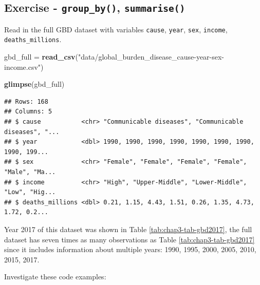 \documentclass[
  12pt,
  krantz2]{krantz}
\makeatletter
\newenvironment{Shaded}{\begin{snugshade}}{\end{snugshade}}
\newcommand{\DataTypeTok}[1]{\textcolor[rgb]{0.13,0.29,0.53}{#1}}
\newcommand{\KeywordTok}[1]{\textcolor[rgb]{0.13,0.29,0.53}{\textbf{#1}}}
\newcommand{\NormalTok}[1]{#1}
\newcommand{\OperatorTok}[1]{\textcolor[rgb]{0.81,0.36,0.00}{\textbf{#1}}}
\newcommand{\StringTok}[1]{\textcolor[rgb]{0.31,0.60,0.02}{#1}}
\newenvironment{kframe}{%
\medskip{}
\setlength{\fboxsep}{.8em}
 \def\at@end@of@kframe{}%
 \ifinner\ifhmode%
  \def\at@end@of@kframe{\end{minipage}}%
  \begin{minipage}{\columnwidth}%
 \fi\fi%
 \def\FrameCommand##1{\hskip\@totalleftmargin \hskip-\fboxsep
 \colorbox{shadecolor}{##1}\hskip-\fboxsep
     \hskip-\linewidth \hskip-\@totalleftmargin \hskip\columnwidth}%
 \MakeFramed {\advance\hsize-\width
   \@totalleftmargin\z@ \linewidth\hsize
   \@setminipage}}%
 {\par\unskip\endMakeFramed%
 \at@end@of@kframe}
\renewenvironment{Shaded}{\begin{kframe}}{\end{kframe}}
\makeatother
\begin{document}
\begin{Shaded}
\end{Shaded}

\hypertarget{exercise---group_by-summarise}{%
\subsection{\texorpdfstring{Exercise - \texttt{group\_by()}, \texttt{summarise()}}{Exercise - group\_by(), summarise()}}\label{exercise---group_by-summarise}}

Read in the full GBD dataset with variables \texttt{cause}, \texttt{year}, \texttt{sex}, \texttt{income}, \texttt{deaths\_millions}.

\begin{Shaded}
\begin{Highlighting}[]
\NormalTok{gbd_full =}\StringTok{ }\KeywordTok{read_csv}\NormalTok{(}\StringTok{"data/global_burden_disease_cause-year-sex-income.csv"}\NormalTok{)}

\KeywordTok{glimpse}\NormalTok{(gbd_full)}
\end{Highlighting}
\end{Shaded}

\begin{verbatim}
## Rows: 168
## Columns: 5
## $ cause           <chr> "Communicable diseases", "Communicable diseases", "...
## $ year            <dbl> 1990, 1990, 1990, 1990, 1990, 1990, 1990, 1990, 199...
## $ sex             <chr> "Female", "Female", "Female", "Female", "Male", "Ma...
## $ income          <chr> "High", "Upper-Middle", "Lower-Middle", "Low", "Hig...
## $ deaths_millions <dbl> 0.21, 1.15, 4.43, 1.51, 0.26, 1.35, 4.73, 1.72, 0.2...
\end{verbatim}

Year 2017 of this dataset was shown in Table \ref{tab:chap3-tab-gbd2017}, the full dataset has seven times as many observations as Table \ref{tab:chap3-tab-gbd2017} since it includes information about multiple years: 1990, 1995, 2000, 2005, 2010, 2015, 2017.

Investigate these code examples:
\end{document}
